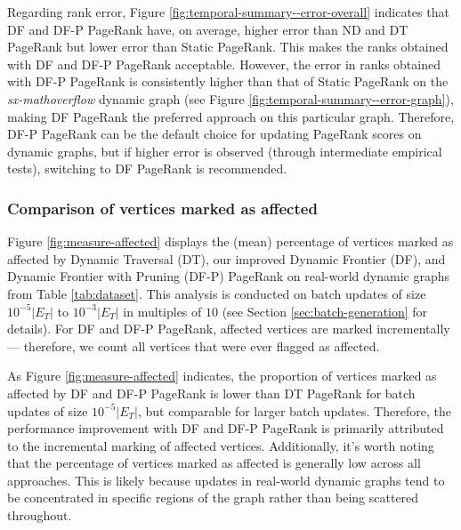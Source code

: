 Regarding rank error, Figure \ref{fig:temporal-summary--error-overall} indicates that DF and DF-P PageRank have, on average, higher error than ND and DT PageRank but lower error than Static PageRank. This makes the ranks obtained with DF and DF-P PageRank acceptable. However, the error in ranks obtained with DF-P PageRank is consistently higher than that of Static PageRank on the \textit{sx-mathoverflow} dynamic graph (see Figure \ref{fig:temporal-summary--error-graph}), making DF PageRank the preferred approach on this particular graph. Therefore, DF-P PageRank can be the default choice for updating PageRank scores on dynamic graphs, but if higher error is observed (through intermediate empirical tests), switching to DF PageRank is recommended.




\subsubsection{Comparison of vertices marked as affected}

Figure \ref{fig:measure-affected} displays the (mean) percentage of vertices marked as affected by Dynamic Traversal (DT), our improved Dynamic Frontier (DF), and Dynamic Frontier with Pruning (DF-P) PageRank on real-world dynamic graphs from Table \ref{tab:dataset}. This analysis is conducted on batch updates of size $10^{-5}|E_T|$ to $10^{-3}|E_T|$ in multiples of $10$ (see Section \ref{sec:batch-generation} for details). For DF and DF-P PageRank, affected vertices are marked incrementally --- therefore, we count all vertices that were ever flagged as affected.

As Figure \ref{fig:measure-affected} indicates, the proportion of vertices marked as affected by DF and DF-P PageRank is lower than DT PageRank for batch updates of size $10^{-5}|E_T|$, but comparable for larger batch updates. Therefore, the performance improvement with DF and DF-P PageRank is primarily attributed to the incremental marking of affected vertices. Additionally, it's worth noting that the percentage of vertices marked as affected is generally low across all approaches. This is likely because updates in real-world dynamic graphs tend to be concentrated in specific regions of the graph rather than being scattered throughout.


